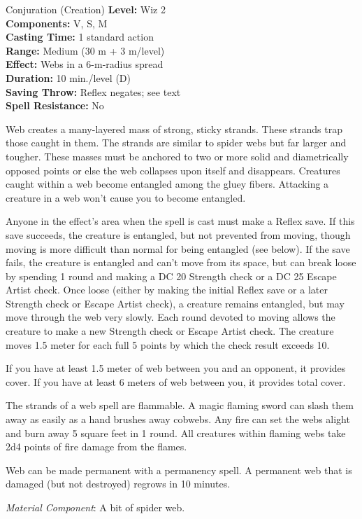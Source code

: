 {Conjuration (Creation)}
{
	\textbf{Level:}
	Wiz 2\\
	\textbf{Components:}
	V, S, M\\
	\textbf{Casting Time:}
	1 standard action\\
	\textbf{Range:}
	Medium (30 m + 3 m/level)\\
	\textbf{Effect:}
	Webs in a 6-m-radius spread\\
	\textbf{Duration:}
	10 min./level (D)\\
	\textbf{Saving Throw:}
	Reflex negates; see text\\
	\textbf{Spell Resistance:}
	No\\
}
{
	Web creates a many-layered mass of strong, sticky strands. These strands trap those caught in them. The strands are similar to spider webs but far larger and tougher. These masses must be anchored to two or more solid and diametrically opposed points or else the web collapses upon itself and disappears. Creatures caught within a web become entangled among the gluey fibers. Attacking a creature in a web won't cause you to become entangled.

	Anyone in the effect's area when the spell is cast must make a Reflex save. If this save succeeds, the creature is entangled, but not prevented from moving, though moving is more difficult than normal for being entangled (see below). If the save fails, the creature is entangled and can't move from its space, but can break loose by spending 1 round and making a DC 20 Strength check or a DC 25 Escape Artist check. Once loose (either by making the initial Reflex save or a later Strength check or Escape Artist check), a creature remains entangled, but may move through the web very slowly. Each round devoted to moving allows the creature to make a new Strength check or Escape Artist check. The creature moves 1.5 meter for each full 5 points by which the check result exceeds 10.

	If you have at least 1.5 meter of web between you and an opponent, it provides cover. If you have at least 6 meters of web between you, it provides total cover.

	The strands of a web spell are flammable. A magic flaming sword can slash them away as easily as a hand brushes away cobwebs. Any fire can set the webs alight and burn away 5 square feet in 1 round. All creatures within flaming webs take 2d4 points of fire damage from the flames.

	Web can be made permanent with a permanency spell. A permanent web that is damaged (but not destroyed) regrows in 10 minutes.

	\textit{Material Component}:
	A bit of spider web.

}
